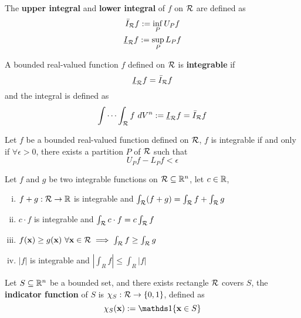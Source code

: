 \documentclass[11pt]{article}
\begin{document}
			\begin{definition}
				The \textbf{upper integral} and \textbf{lower integral} of $f$ on $\mathcal{{R}}$ are defined as
				\begin{gather}
					\bar{I}_{\mathcal{{R}}} f := \inf_{P} U_P f \\
					\underline{I}_{\mathcal{{R}}} f := \sup_{P} L_P f
				\end{gather}
			\end{definition}
			
			\begin{definition}
				A bounded real-valued function $f$ defined on $\mathcal{{R}}$ is \textbf{integrable} if
				\begin{equation}
					\underline{I}_{\mathcal{{R}}} f = \bar{I}_{\mathcal{{R}}} f
				\end{equation}
				and the integral is defined as
				\begin{equation}
					\int \cdots \int_{\mathcal{{R}}} f\ dV^n := \underline{I}_{\mathcal{{R}}} f = \bar{I}_{\mathcal{{R}}} f
				\end{equation}
			\end{definition}
			
			\begin{lemma}
				Let $f$ be a bounded real-valued function defined on $\mathcal{{R}}$, $f$ is integrable if and only if $\forall \epsilon > 0$, there exists a partition $P$ of $\mathcal{{R}}$ such that
				\begin{equation}
					U_P f - L_P f < \epsilon
				\end{equation}
			\end{lemma}
			
			\begin{theorem}
				Let $f$ and $g$ be two integrable functions on $\mathcal{{R}} \subseteq \mathbb{R}^n$, let $c \in \mathbb{R}$, 
				\begin{enumerate}[(i)]
					\item $f+g:\mathcal{{R}} \to \mathbb{R}$ is integrable and $\int_{\mathcal{{R}}} (f+g) = \int_{\mathcal{{R}}} f + \int_{\mathcal{{R}}} g$
					\item $c \cdot f$ is integrable and $\int_{\mathcal{{R}}} c \cdot f = c \int_{\mathcal{{R}}} f$
					\item $f(\textbf{x}) \geq g(\textbf{x})\ \forall \textbf{x} \in \mathcal{{R}} \implies \int_{\mathcal{{R}}} f \geq \int_{\mathcal{{R}}} g$
					\item $|f|$ is integrable and $|\int_{R} f| \leq \int_{R} |f|$
				\end{enumerate}
			\end{theorem}
			
			\begin{definition}
				Let $S \subseteq \mathbb{R}^n$ be a bounded set, and there exists rectangle $\mathcal{{R}}$ covers $S$, the \textbf{indicator function} of $S$ is $\chi_S: \mathcal{{R}} \to \{0, 1\}$, defined as
				\begin{equation}
					\chi_S (\ve{x}) := \id{\ve{x} \in S}
				\end{equation}
			\end{definition}
			
\end{document}
